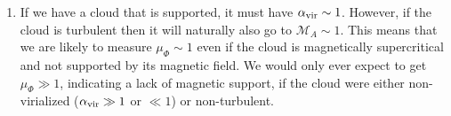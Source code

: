 \begin{enumerate}
\begin{enumerate}
\item If we have a cloud that is supported, it must have $\alpha_{\rm vir}\sim 1$. However, if the cloud is turbulent then it will naturally also go to $\mathcal{M}_A \sim 1$. This means that we are likely to measure $\mu_{\Phi}\sim 1$ even if the cloud is magnetically supercritical and not supported by its magnetic field. We would only ever expect to get $\mu_{\Phi} \gg 1$, indicating a lack of magnetic support, if the cloud were either non-virialized ($\alpha_{\rm vir} \gg 1$ or $\ll 1$) or non-turbulent.

\end{enumerate}


\end{enumerate}



